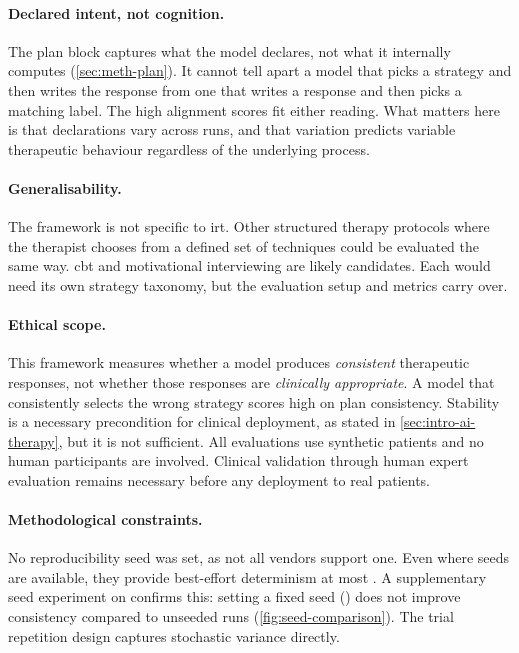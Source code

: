 \paragraph{Declared intent, not cognition.}
The plan block captures what the model declares, not what it internally
computes (\autoref{sec:meth-plan}). It cannot tell apart a model that
picks a strategy and then writes the response from one that writes a
response and then picks a matching label. The high alignment scores fit
either reading. What matters here is that declarations vary across runs,
and that variation predicts variable therapeutic behaviour regardless of
the underlying process.

\paragraph{Generalisability.}
The framework is not specific to \gls{irt}. Other structured therapy
protocols where the therapist chooses from a defined set of techniques
could be evaluated the same way. \gls{cbt} and motivational interviewing
are likely candidates. Each would need its own strategy taxonomy, but the
evaluation setup and metrics carry over.

\paragraph{Ethical scope.}
This framework measures whether a model produces \emph{consistent}
therapeutic responses, not whether those responses are \emph{clinically
appropriate}. A model that consistently selects the wrong strategy scores
high on plan consistency. Stability is a necessary precondition for
clinical deployment, as stated in \autoref{sec:intro-ai-therapy}, but it
is not sufficient. All evaluations use synthetic patients and no human
participants are involved. Clinical validation through human expert
evaluation remains necessary before any deployment to real patients.

\paragraph{Methodological constraints.}
No reproducibility seed was set, as not all vendors support one. Even
where seeds are available, they provide best-effort determinism at most
\parencite{HITR7PL4}. A supplementary seed experiment on
 confirms this: setting a fixed seed
() does not improve consistency compared to unseeded
runs (\autoref{fig:seed-comparison}). The trial repetition design
captures stochastic variance directly.

